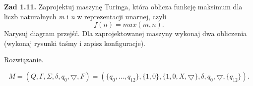 \documentclass[12pt]{article}
\begin{document}
\begin{Parallel}{0.48\textwidth}{0.5\textwidth}
{\begin{tikzpicture}[every node/.style={block},
        block/.style={minimum height=0.7cm,minimum width=0.7cm,outer sep=0pt,draw,rectangle,node distance=0pt}]
\end{tikzpicture}

}


\end{Parallel}

\newpage

\noindent\textbf{Zad 1.11.} Zaprojektuj maszynę Turinga, która oblicza funkcję maksimum dla liczb naturalnych \textit{m} i \textit{n} w reprezentacji unarnej, czyli
\[f(n)=max(m,n).\]
Narysuj diagram przejść. Dla zaprojektowanej maszyny wykonaj dwa obliczenia (wykonaj rysunki taśmy i zapisz konfiguracje).

 Rozwiązanie.
 
\[M=(Q,\Gamma,\Sigma,\delta,q_0,\bigtriangledown,F)=(\{q_0,...,q_{12}\},\{1,0\},\{1,0,X,\bigtriangledown\},\delta,q_0,\bigtriangledown,\{q_{12}\}).\]
\end{document}
